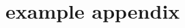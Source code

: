 \appendix

\setcounter{figure}{0}
\setcounter{table}{0}
\setcounter{equation}{0}

\chapter{example appendix}
\label{appendix:A}